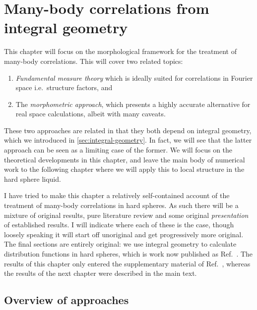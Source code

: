 \documentclass[11pt]{report}
\begin{document}
\chapter{Many-body correlations from integral geometry}

This chapter will focus on the morphological framework for the treatment of many-body correlations.
This will cover two related topics:
\begin{enumerate}
\item \emph{Fundamental measure theory} which is ideally suited for correlations in Fourier space i.e.\ structure factors, and
\item The \emph{morphometric approach}, which presents a highly accurate alternative for real space calculations, albeit with many caveats.
\end{enumerate}
These two approaches are related in that they both depend on integral geometry, which we introduced in \ref{sec:integral-geometry}.
In fact, we will see that the latter approach can be seen as a limiting case of the former.
We will focus on the theoretical developments in this chapter, and leave the main body of numerical work to the following chapter where we will apply this to local structure in the hard sphere liquid.

I have tried to make this chapter a relatively self-contained account of the treatment of many-body correlations in hard spheres.
As such there will be a mixture of original results, pure literature review and some original \emph{presentation} of established results.
I will indicate where each of these is the case, though loosely speaking it will start off unoriginal and get progressively more original.
The final sections are entirely original: we use integral geometry to calculate distribution functions in hard spheres, which is work now published as Ref.\ \cite{Robinson2019}.
The results of this chapter only entered the supplementary material of Ref.\ \cite{Robinson2019}, whereas the results of the next chapter were described in the main text.

\section{Overview of approaches}
\end{document}
